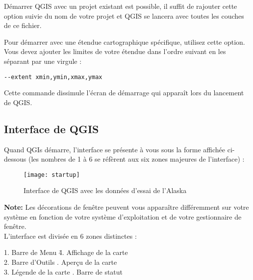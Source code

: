 Démarrer QGIS avec un projet existant est possible, il suffit de rajouter cette option suivie du nom de votre projet et QGIS se lancera avec toutes les couches de ce fichier.

Pour démarrer avec une étendue cartographique spécifique, utilisez cette option. Vous devez ajouter les limites de votre étendue dans l'ordre suivant en les séparant par une virgule :
\begin{verbatim}
--extent xmin,ymin,xmax,ymax
\end{verbatim}

Cette commande dissimule l'écran de démarrage qui apparaît lors du lancement de QGIS.

\subsection{Interface de QGIS}
\label{label_qgismainwindow}

Quand QGIs démarre, l'interface se présente à vous sous la forme affichée ci-dessous (les nombres de 1 à 6 se réfèrent aux six zones majeures de l'interface) :

\begin{figure}[ht]
   \begin{center}
   \caption{Interface de QGIS avec les données d'essai de l'Alaska \nixcaption}
  \label{fig:startup}
   \texttt{[image: startup]}
\end{center} 
\end{figure}

\textbf{Note:} Les décorations de fenêtre peuvent vous apparaître différemment sur votre système en fonction de votre système d'exploitation et de votre gestionnaire de fenêtre. \\

L'interface est divisée en 6 zones distinctes :

\begin{tabbing}
1. Barre de Menu \hspace{3cm}\= 4. Affichage de la carte \\
2. Barre d'Outils \hspace{3cm}. Aperçu de la carte  \\
3. Légende de la carte \hspace{3cm}. Barre de statut   
\end{tabbing}

